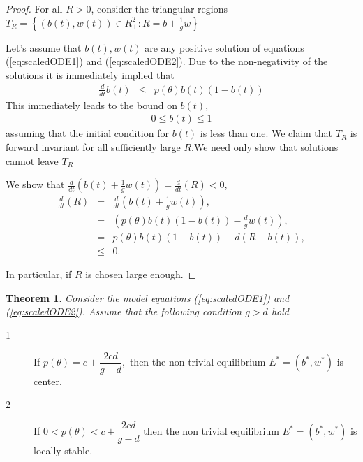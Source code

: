 \documentclass[12pt]{article}
\newtheorem{theorem}{Theorem}[section]
\begin{document}
\begin{proof}
For all $R>0$, consider the triangular regions $T_{R}=\left\{ \left(
b(t),w(t)\right) \in R_{+}^{2}:R=b+\frac{1}{g}w\right\} $

Let's assume that $b(t),w(t)$ are any positive solution of equations
(\ref{eq:scaledODE1}) and (\ref{eq:scaledODE2}). Due to the
non-negativity of the solutions it is immediately implied that
\begin{eqnarray}
  \frac{d}{dt}b(t) & \leq & p\left( \theta \right) b(t)\left( 1-b(t)\right) 
\end{eqnarray}
This immediately leads to the bound on $b(t)$,
\begin{eqnarray}
  0\leq b(t)\leq 1
\end{eqnarray}
assuming that the initial condition for $b(t)$ is less than one.  We
claim that $T_{R}$ is forward invariant for all sufficiently large
$R.$We need only show that solutions cannot leave $T_{R}$

We show that
$\frac{d}{dt}\left( b(t)+\frac{1}{g}w(t)\right) =\frac{d}{dt}%
\left( R\right) <0$,
\begin{eqnarray}
  \frac{d}{dt}\left( R\right) & = & \frac{d}{dt}\left( b(t)+\frac{1}{g}w(t)\right), \\
                              & = & \left( p\left( \theta \right) b(t)
                                    \left( 1-b(t)\right) -
                                     \frac{d}{g}w\left( t\right) \right), \\
                              & = & p\left( \theta \right) b(t)\left(1-b(t)\right) -
                                    d\left( R-b(t)\right), \\
                              & \leq & 0.
\end{eqnarray}


In particular, if $R$ is chosen large enough.
\end{proof}
\begin{theorem}
   Consider the model equations (\ref{eq:scaledODE1}) and
  (\ref{eq:scaledODE2}). Assume that the following condition $g>d$
  hold
\end{theorem}

\begin{description}
\item[1]  If $%
p(\theta )=c+\dfrac{2cd}{g-d},$ then the non trivial equilibrium $%
E^{\ast }=(b^{\ast },w^{\ast })$ is center.

\item[2] If $0<p(\theta )<c+\dfrac{2cd}{g-d}$ then the non trivial
equilibrium $E^{\ast }=(b^{\ast },w^{\ast })$ is locally stable.
\end{description}
\end{document}
